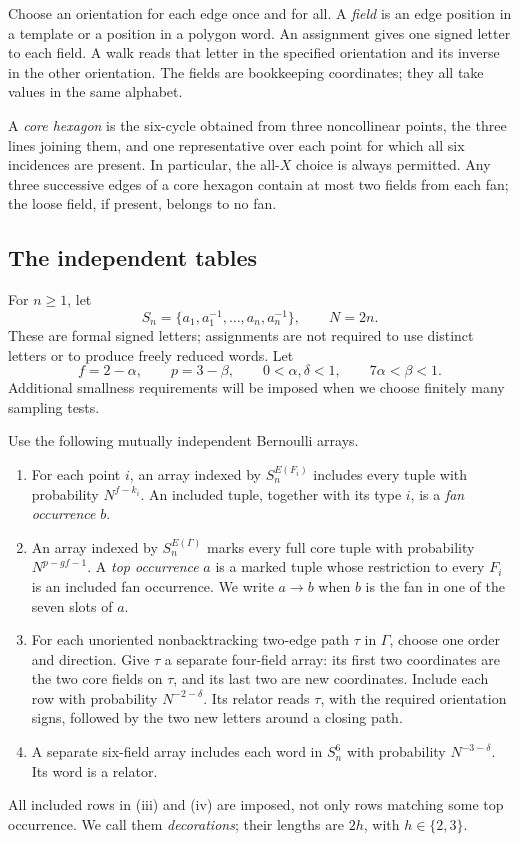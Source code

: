 Choose an orientation for each edge once and for all. A \emph{field} is an edge position in a template or a position in a polygon word. An assignment gives one signed letter to each field. A walk reads that letter in the specified orientation and its inverse in the other orientation. The fields are bookkeeping coordinates; they all take values in the same alphabet.

A \emph{core hexagon} is the six-cycle obtained from three noncollinear points, the three lines joining them, and one representative over each point for which all six incidences are present. In particular, the all-$X$ choice is always permitted. Any three successive edges of a core hexagon contain at most two fields from each fan; the loose field, if present, belongs to no fan.

\FloatBarrier
\subsection{The independent tables}
For $n\ge1$, let
\[
 S_n=\{a_1,a_1^{-1},\ldots,a_n,a_n^{-1}\},\qquad N=2n.
\]
These are formal signed letters; assignments are not required to use distinct letters or to produce freely reduced words. Let
\begin{equation}\label{eq:model-parameters}
 f=2-\alpha,\qquad p=3-\beta,\qquad
 0<\alpha,\delta<1,\qquad 7\alpha<\beta<1.
\end{equation}
Additional smallness requirements will be imposed when we choose finitely many sampling tests.

\begin{definition}\label{def:tables}
Use the following mutually independent Bernoulli arrays.
\begin{enumerate}[label=\textup{(\roman*)}]
\item For each point $i$, an array indexed by $S_n^{E(F_i)}$ includes every tuple with probability $N^{f-k_i}$. An included tuple, together with its type $i$, is a \emph{fan occurrence} $b$.
\item An array indexed by $S_n^{E(\Gamma)}$ marks every full core tuple with probability $N^{p-gf-1}$. A \emph{top occurrence} $a$ is a marked tuple whose restriction to every $F_i$ is an included fan occurrence. We write $a\to b$ when $b$ is the fan in one of the seven slots of $a$.
\item For each unoriented nonbacktracking two-edge path $\tau$ in $\Gamma$, choose one order and direction. Give $\tau$ a separate four-field array: its first two coordinates are the two core fields on $\tau$, and its last two are new coordinates. Include each row with probability $N^{-2-\delta}$. Its relator reads $\tau$, with the required orientation signs, followed by the two new letters around a closing path.
\item A separate six-field array includes each word in $S_n^6$ with probability $N^{-3-\delta}$. Its word is a relator.
\end{enumerate}
All included rows in \textup{(iii)} and \textup{(iv)} are imposed, not only rows matching some top occurrence. We call them \emph{decorations}; their lengths are $2h$, with $h\in\{2,3\}$.
\end{definition}

